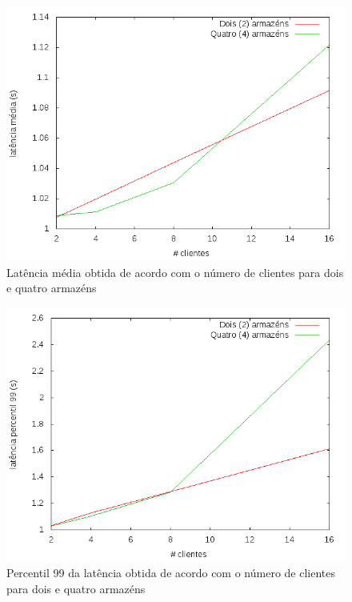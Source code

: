 \newpage

\begin{figure}[!h]
\centering
\includegraphics[scale=.4]{img/questao-1/rep-read-lat-med}
\caption{Latência média obtida de acordo com o número de clientes para dois e quatro armazéns}
\end{figure}


\begin{figure}[!h]
\centering
\includegraphics[scale=.4]{img/questao-1/rep-read-lat-pct99}
\caption{Percentil 99 da latência obtida de acordo com o número de clientes para dois e quatro armazéns}
\end{figure}

